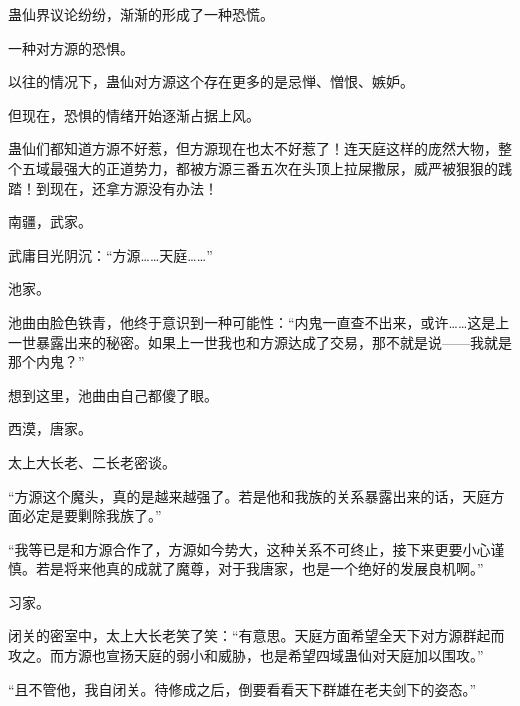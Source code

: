 \begin{this_body}
蛊仙界议论纷纷，渐渐的形成了一种恐慌。

一种对方源的恐惧。

以往的情况下，蛊仙对方源这个存在更多的是忌惮、憎恨、嫉妒。

但现在，恐惧的情绪开始逐渐占据上风。

蛊仙们都知道方源不好惹，但方源现在也太不好惹了！连天庭这样的庞然大物，整个五域最强大的正道势力，都被方源三番五次在头顶上拉屎撒尿，威严被狠狠的践踏！到现在，还拿方源没有办法！

南疆，武家。

武庸目光阴沉：“方源……天庭……”

池家。

池曲由脸色铁青，他终于意识到一种可能性：“内鬼一直查不出来，或许……这是上一世暴露出来的秘密。如果上一世我也和方源达成了交易，那不就是说——我就是那个内鬼？”

想到这里，池曲由自己都傻了眼。

西漠，唐家。

太上大长老、二长老密谈。

“方源这个魔头，真的是越来越强了。若是他和我族的关系暴露出来的话，天庭方面必定是要剿除我族了。”

“我等已是和方源合作了，方源如今势大，这种关系不可终止，接下来更要小心谨慎。若是将来他真的成就了魔尊，对于我唐家，也是一个绝好的发展良机啊。”

习家。

闭关的密室中，太上大长老笑了笑：“有意思。天庭方面希望全天下对方源群起而攻之。而方源也宣扬天庭的弱小和威胁，也是希望四域蛊仙对天庭加以围攻。”

“且不管他，我自闭关。待修成之后，倒要看看天下群雄在老夫剑下的姿态。”

\end{this_body}

